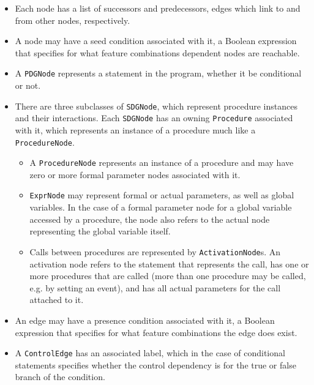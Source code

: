 \begin{itemize}
  \item Each node has a list of successors and predecessors, edges which link to and from other nodes, respectively.
  
  \item A node may have a seed condition associated with it, a Boolean expression that specifies for what feature 
  combinations dependent nodes are reachable.
  
  \item A \lstinline|PDGNode| represents a statement in the program, whether it be conditional or not.
  
  \item There are three subclasses of \lstinline|SDGNode|, which represent procedure instances and their interactions. 
  Each \lstinline|SDGNode| has an owning \lstinline|Procedure| associated with it, which represents an instance of a 
  procedure much like a \lstinline|ProcedureNode|.
  \begin{itemize}
    \item A \lstinline|ProcedureNode| represents an instance of a procedure and may have zero or more formal parameter 
    nodes associated with it.
    
    \item \lstinline|ExprNode| may represent formal or actual parameters, as well as global variables. In the case of a 
    formal parameter node for a global variable accessed by a procedure, the node also refers to the actual node 
    representing the global variable itself.
    
    \item Calls between procedures are represented by \lstinline|ActivationNode|s. An activation node refers to the 
    statement that represents the call, has one or more procedures that are called (more than one procedure may be 
    called, e.g. by setting an event), and has all actual parameters for the call attached to it.
  \end{itemize}
  
  \item An edge may have a presence condition associated with it, a Boolean expression that specifies for what feature 
  combinations the edge does exist.
  
  \item A \lstinline|ControlEdge| has an associated label, which in the case of conditional statements specifies 
  whether the control dependency is for the true or false branch of the condition.
\end{itemize}

